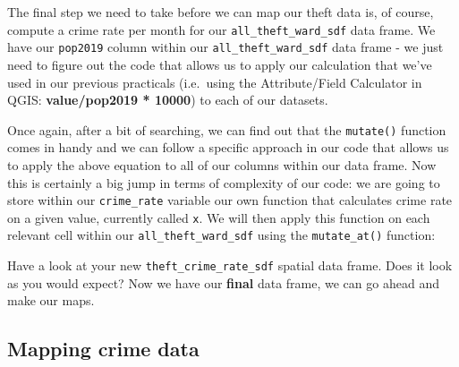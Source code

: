 \documentclass[
]{book}
\newenvironment{Shaded}{\begin{snugshade}}{\end{snugshade}}
\newcommand{\AttributeTok}[1]{\textcolor[rgb]{0.77,0.63,0.00}{#1}}
\newcommand{\CommentTok}[1]{\textcolor[rgb]{0.56,0.35,0.01}{\textit{#1}}}
\newcommand{\ConstantTok}[1]{\textcolor[rgb]{0.00,0.00,0.00}{#1}}
\newcommand{\ControlFlowTok}[1]{\textcolor[rgb]{0.13,0.29,0.53}{\textbf{#1}}}
\newcommand{\DecValTok}[1]{\textcolor[rgb]{0.00,0.00,0.81}{#1}}
\newcommand{\FunctionTok}[1]{\textcolor[rgb]{0.00,0.00,0.00}{#1}}
\newcommand{\NormalTok}[1]{#1}
\newcommand{\OtherTok}[1]{\textcolor[rgb]{0.56,0.35,0.01}{#1}}
\newcommand{\SpecialCharTok}[1]{\textcolor[rgb]{0.00,0.00,0.00}{#1}}
\begin{document}
The final step we need to take before we can map our theft data is, of course, compute a crime rate per month for our \texttt{all\_theft\_ward\_sdf} data frame. We have our \texttt{pop2019} column within our \texttt{all\_theft\_ward\_sdf} data frame - we just need to figure out the code that allows us to apply our calculation that we've used in our previous practicals (i.e.~using the Attribute/Field Calculator in QGIS: \textbf{value/pop2019 * 10000}) to each of our datasets.

Once again, after a bit of searching, we can find out that the \texttt{mutate()} function comes in handy and we can follow a specific approach in our code that allows us to apply the above equation to all of our columns within our data frame. Now this is certainly a big jump in terms of complexity of our code: we are going to store within our \texttt{crime\_rate} variable our own function that calculates crime rate on a given value, currently called \texttt{x}. We will then apply this function on each relevant cell within our \texttt{all\_theft\_ward\_sdf} using the \texttt{mutate\_at()} function:

\begin{Shaded}
\end{Shaded}

Have a look at your new \texttt{theft\_crime\_rate\_sdf} spatial data frame. Does it look as you would expect? Now we have our \textbf{final} data frame, we can go ahead and make our maps.

\hypertarget{mapping-crime-data}{%
\subsection{Mapping crime data}\label{mapping-crime-data}}
\end{document}

